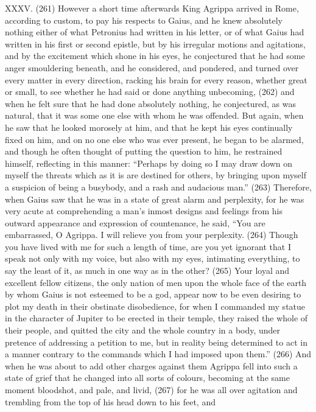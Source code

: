 XXXV. (261) However a short time afterwards King Agrippa arrived in Rome, according to custom,
to pay his respects to Gaius, and he knew absolutely nothing either of what Petronius had written in
his letter, or of what Gaius had written in his first or second epistle, but by his irregular motions and
agitations, and by the excitement which shone in his eyes, he conjectured that he had some anger
smouldering beneath, and he considered, and pondered, and turned over every matter in every
direction, racking his brain for every reason, whether great or small, to see whether he had said or
done anything unbecoming, (262) and when he felt sure that he had done absolutely nothing, he
conjectured, as was natural, that it was some one else with whom he was offended. But again,
when he saw that he looked morosely at him, and that he kept his eyes continually fixed on him,
and on no one else who was ever present, he began to be alarmed, and though he often thought of
putting the question to him, he restrained himself, reflecting in this manner: ``Perhaps by doing so I
may draw down on myself the threats which as it is are destined for others, by bringing upon myself
a suspicion of being a busybody, and a rash and audacious man.'' (263) Therefore, when Gaius
saw that he was in a state of great alarm and perplexity, for he was very acute at comprehending a
man's inmost designs and feelings from his outward appearance and expression of countenance,
he said, ``You are embarrassed, O Agrippa. I will relieve you from your perplexity. (264) Though
you have lived with me for such a length of time, are you yet ignorant that I speak not only with my
voice, but also with my eyes, intimating everything, to say the least of it, as much in one way as in
the other? (265) Your loyal and excellent fellow citizens, the only nation of men upon the whole
face of the earth by whom Gaius is not esteemed to be a god, appear now to be even desiring to
plot my death in their obstinate disobedience, for when I commanded my statue in the character of
Jupiter to be erected in their temple, they raised the whole of their people, and quitted the city and
the whole country in a body, under pretence of addressing a petition to me, but in reality being
determined to act in a manner contrary to the commands which I had imposed upon them.'' (266)
And when he was about to add other charges against them Agrippa fell into such a state of grief
that he changed into all sorts of colours, becoming at the same moment bloodshot, and pale, and
livid, (267) for he was all over agitation and trembling from the top of his head down to his feet, and
